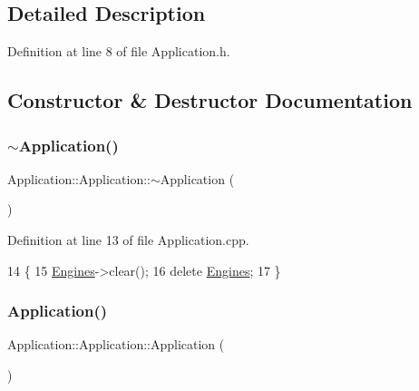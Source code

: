 \subsection{Detailed Description}


Definition at line 8 of file Application.\+h.



\subsection{Constructor \& Destructor Documentation}
\mbox{\label{classApplication_1_1Application_aeef3ff221435f74e41115640239e6f34}} 
\subsubsection{\texorpdfstring{$\sim$\+Application()}{~Application()}}
{\footnotesize\ttfamily Application\+::\+Application\+::$\sim$\+Application (\begin{DoxyParamCaption}{ }\end{DoxyParamCaption})}



Definition at line 13 of file Application.\+cpp.


\begin{DoxyCode}
14 \{
15     \mbox{\hyperlink{classApplication_1_1Application_a4f2808bddfc3f8fb2ed3a3fe0d4659ff}{Engines}}->clear();
16     \textcolor{keyword}{delete} \mbox{\hyperlink{classApplication_1_1Application_a4f2808bddfc3f8fb2ed3a3fe0d4659ff}{Engines}};
17 \}
\end{DoxyCode}
\mbox{\label{classApplication_1_1Application_aa27a092cca399b3ccee7419a7cda4563}} 
\subsubsection{\texorpdfstring{Application()}{Application()}}
{\footnotesize\ttfamily Application\+::\+Application\+::\+Application (\begin{DoxyParamCaption}{ }\end{DoxyParamCaption})\hspace{0.3cm}{\ttfamily [private]}}



